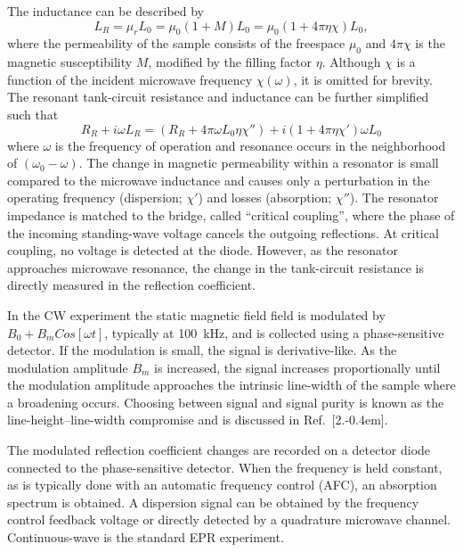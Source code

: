 The inductance can be described by
\begin{equation}
    L_R = \mu_r L_0 = \mu_0 (1 + M)L_0 = \mu_0 (1 + 4 \pi \eta \chi)L_0,
\end{equation}
where the permeability of the sample consists of the freespace $\mu_0$ and $4\pi\chi$ is the magnetic susceptibility $M$, modified by the filling factor $\eta$. \cite{ramo1984fields} Although $\chi$ is a function of the incident microwave frequency $\chi(\omega)$, it is omitted for brevity. The resonant tank-circuit resistance and inductance can be further simplified such that
\begin{equation}
    R_R + i \omega L_R = (R_R + 4\pi \omega L_0 \eta \chi'') + i (1+4\pi\eta\chi')\omega L_0
\end{equation}
where $\omega$ is the frequency of operation and resonance occurs in the neighborhood of $(\omega_0-\omega)$. \cite{schumacher1970introduction} The change in magnetic permeability within a resonator is small compared to the microwave inductance and causes only a perturbation in the operating frequency (dispersion; $\chi'$) and losses (absorption; $\chi''$). The resonator impedance is matched to the bridge, called ``critical coupling'', where the phase of the incoming standing-wave voltage cancels the outgoing reflections. At critical coupling, no voltage is detected at the diode. However, as the resonator approaches microwave resonance, the change in the tank-circuit resistance is directly measured in the reflection coefficient. 

In the CW experiment the static magnetic field field is modulated by $B_0 + B_m Cos[\omega t]$, typically at 100~kHz, and is collected using a phase-sensitive detector. \cite{weil2007electron} If the modulation is small, the signal is derivative-like. \cite{Hyde1990pseudo} As the modulation amplitude $B_m$ is increased, the signal increases proportionally until the modulation amplitude approaches the intrinsic line-width of the sample where a broadening occurs. Choosing between signal and signal purity is known as the line-height--line-width compromise and is discussed in Ref.~[2.\kern-0.4em]. 

The modulated reflection coefficient changes are recorded on a detector diode connected to the phase-sensitive detector. When the frequency is held constant, as is typically done with an automatic frequency control (AFC), an absorption spectrum is obtained. \cite{poole1967electron} A dispersion signal can be obtained by the frequency control feedback voltage or directly detected by a quadrature microwave channel. Continuous-wave is the standard EPR experiment. 

